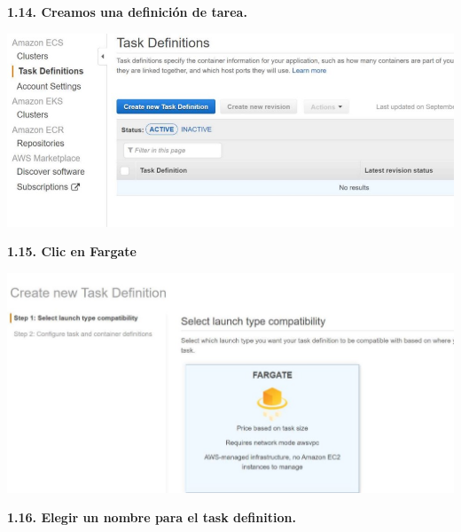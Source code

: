 \documentclass{article}
\begin{document}
	\textbf{1.14. Creamos una definición de tarea.
}

    \begin{center}
		\includegraphics[width=15cm]{./images/15} 
	\end{center}
	
	\textbf{1.15.  Clic en Fargate
}

    \begin{center}
		\includegraphics[width=15cm]{./images/16} 
	\end{center}
	
	\textbf{1.16.  Elegir un nombre para el task definition.
}
\end{document}
